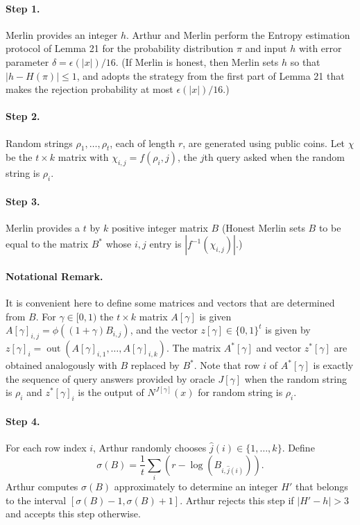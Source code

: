\paragraph{Step 1.} Merlin provides an integer $h$. Arthur and Merlin perform the Entropy estimation protocol of Lemma 21 for the probability distribution $\pi$ and input $h$ with error parameter $\delta=\epsilon(|x|)/16$. (If Merlin is honest, then Merlin sets $h$ so that $|h-H(\pi)|\le1$, and adopts the strategy from the first part of Lemma 21 that makes the rejection probability at most $\epsilon(|x|)/16$.)
\paragraph{Step 2.} Random strings $\rho_1,\ldots,\rho_t$, each of length $r$, are generated using public coins. Let $\chi$ be the $t\times k$ matrix with $\chi_{i,j}=f(\rho_i,j)$, the $j$th query asked when the random string is $\rho_i$.
\paragraph{Step 3.} Merlin provides a $t$ by $k$ positive integer matrix $B$ (Honest Merlin sets $B$ to be equal to the matrix $B^*$ whose $i,j$ entry is $|f^{-1}(\chi_{i,j})|$.)
\paragraph{Notational Remark.} It is convenient here to define some matrices and vectors that are determined from $B$. For $\gamma\in[0,1)$ the $t\times k$ matrix $A[\gamma]$ is given $A[\gamma]_{i,j}=\phi((1+\gamma)B_{i,j})$, and the vector $z[\gamma]\in\{0,1\}^t$ is given by $z[\gamma]_i=\operatorname{out}(A[\gamma]_{i,1},\ldots,A[\gamma]_{i,k})$. The matrix $A^*[\gamma]$ and vector $z^*[\gamma]$ are obtained analogously with $B$ replaced by $B^*$. Note that row $i$ of $A^*[\gamma]$ is exactly the sequence of query answers provided by oracle $J[\gamma]$ when the random string is $\rho_i$ and $z^*[\gamma]_i$ is the output of $N^{J[\gamma]}(x)$ for random string is $\rho_i$.
\paragraph{Step 4.} For each row index $i$, Arthur randomly chooses $\hat j(i)\in\{1,\ldots,k\}$. Define
\[\sigma(B)=\frac1t\sum_i(r-\log(B_{i,\hat j(i)})).\]
Arthur computes $\sigma(B)$ approximately to determine an integer $H'$ that belongs to the interval $[\sigma(B)-1,\sigma(B)+1]$. Arthur rejects this step if $|H'-h|>3$ and accepts this step otherwise.

